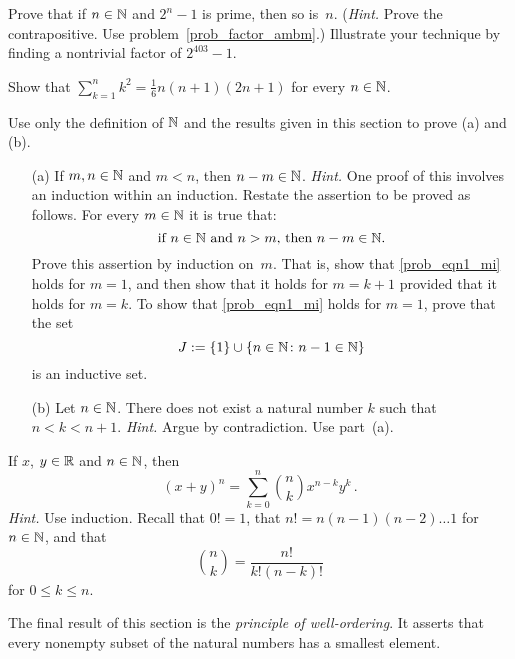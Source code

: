 \begin{prob}  Prove that if $n \in \mathbb{N}$ and $2^n - 1$ is prime, then so is~$n$. (\emph{Hint.}
Prove the contrapositive.  Use problem~\ref{prob_factor_ambm}.)  Illustrate your technique by
finding a nontrivial factor of $2^{403} - 1$.
\end{prob}

\begin{prob}\label{prob_sum_sqrs}  Show that $\sum_{k=1}^nk^2 = \frac16 n(n+1)(2n+1)$ for every
$n \in \mathbb{N}$.
\end{prob}

\begin{prob}\label{prob_less_pos}  Use only the definition of $\mathbb{N}$ and the results given in this
section to prove (a) and (b).
 \begin{enumerate}
  \item[(a)] If $m,n \in \mathbb{N}$ and $m < n$, then $n - m \in \mathbb{N}$. \emph{Hint.}  One proof of this
involves an induction within an induction.  Restate the assertion to be proved as follows.
For every $m \in \mathbb{N}$ it is true that:
   \begin{equation}\label{prob_eqn1_mi}
         \text{if $n \in \mathbb{N}$ and $n > m$, then $n - m \in \mathbb{N}$.}
   \end{equation}
Prove this assertion by induction on~$m$.  That is, show that \eqref{prob_eqn1_mi} holds for
$m = 1$, and then show that it holds for $m = k + 1$ provided that it holds for $m = k$.  To
show that \eqref{prob_eqn1_mi} holds for $m = 1$, prove that the set
   \[ J := \{1\} \cup \{n \in \mathbb{N} \colon n - 1 \in \mathbb{N}\} \]
is an inductive set.
  \item[(b)] Let $n \in \mathbb{N}$.  There does not exist a natural number $k$ such that $n < k < n+1$.
\emph{Hint.}  Argue by contradiction. Use part~(a).
 \end{enumerate}
\end{prob}

\begin{prob}\label{binom_thm} If $x$, $y \in \mathbb{R}$ and $n \in \mathbb{N}$, then
  \[ (x + y)^n = \sum_{k=0}^n\binom nkx^{n-k}y^k\,. \]
\emph{Hint.}  Use induction.  Recall that $0! = 1$, that $n! = n(n - 1)(n - 2) \dots 1$ for $n
\in \mathbb{N}$, and that
  \[ \binom nk = \frac{n!}{k!(n-k)!} \]
for  $0 \le k \le n$.
\end{prob}

The final result of this section is the
\emph{principle of well-ordering}.  It asserts that every nonempty subset of the natural
numbers has a smallest element.


